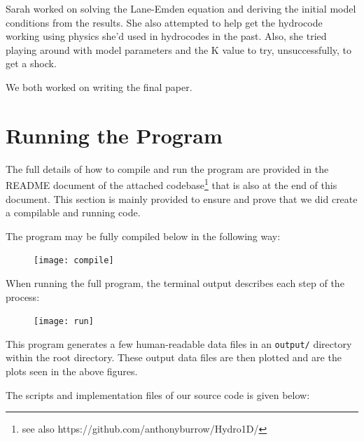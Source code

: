 \documentclass[12pt]{article}
\begin{document}
Sarah worked on solving the Lane-Emden equation and deriving the initial model conditions from the results. She also attempted to help get the hydrocode working using physics she'd used in hydrocodes in the past. Also, she tried playing around with model parameters and the K value to try, unsuccessfully, to get a shock.

We both worked on writing the final paper.


\section{Running the Program}

The full details of how to compile and run the program are provided in the README document of the attached
codebase\footnote{see also https://github.com/anthonyburrow/Hydro1D/} that is also at the end of this
document. This section is mainly provided to ensure and prove that we did create a compilable and running code.

The program may be fully compiled below in the following way:
\begin{figure}[H]
    \centering
    \texttt{[image: compile]}
    \label{fig:compile}
\end{figure}
When running the full program, the terminal output describes each step of the process:
\begin{figure}[H]
    \centering
    \texttt{[image: run]}
    \label{fig:run}
\end{figure}

This program generates a few human-readable data files in an \texttt{output/} directory within the
root directory. These output data files are then plotted and are the plots seen in the above figures.



\pagebreak

The scripts and implementation files of our source code is given below:
\end{document}
